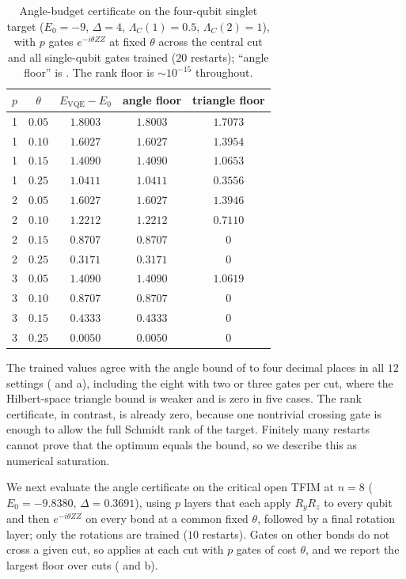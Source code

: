 \documentclass[reprint,aps,pra,floatfix,superscriptaddress,nofootinbib,longbibliography]{revtex4-2}
\theoremstyle{remark}
\theoremstyle{definition}
\begin{document}
\begin{table}[t]
\centering
\caption{Angle-budget certificate on the four-qubit singlet target ($E_0=-9$,
$\Delta=4$, $\Lambda_C(1)=0.5$, $\Lambda_C(2)=1$), with $p$ gates
$e^{-i\theta ZZ}$ at fixed $\theta$ across the central cut and all single-qubit
gates trained ($20$ restarts); ``angle floor'' is . The rank
floor is ${\sim}10^{-15}$ throughout.}
\label{tab:angle}
{\small\setlength{\tabcolsep}{5pt}
\begin{tabular}{ccccc}
\toprule
$p$ & $\theta$ & $E_{\mathrm{VQE}}-E_0$ & angle floor & triangle floor\\
\midrule
1 & $0.05$ & $1.8003$ & $1.8003$ & $1.7073$\\
1 & $0.10$ & $1.6027$ & $1.6027$ & $1.3954$\\
1 & $0.15$ & $1.4090$ & $1.4090$ & $1.0653$\\
1 & $0.25$ & $1.0411$ & $1.0411$ & $0.3556$\\
2 & $0.05$ & $1.6027$ & $1.6027$ & $1.3946$\\
2 & $0.10$ & $1.2212$ & $1.2212$ & $0.7110$\\
2 & $0.15$ & $0.8707$ & $0.8707$ & $0$\\
2 & $0.25$ & $0.3171$ & $0.3171$ & $0$\\
3 & $0.05$ & $1.4090$ & $1.4090$ & $1.0619$\\
3 & $0.10$ & $0.8707$ & $0.8707$ & $0$\\
3 & $0.15$ & $0.4333$ & $0.4333$ & $0$\\
3 & $0.25$ & $0.0050$ & $0.0050$ & $0$\\
\bottomrule
\end{tabular}}
\end{table}

The trained values agree with the angle bound of  to four
decimal places in all $12$ settings ( and a),
including the eight with two or three gates per cut, where the Hilbert-space
triangle bound is weaker and is zero in five cases. The rank certificate, in contrast, is
already zero, because one nontrivial crossing gate is enough to allow the full
Schmidt rank of the target. Finitely many restarts cannot prove that the optimum
equals the bound, so we describe this as numerical saturation.

We next evaluate the angle certificate on the critical open TFIM at $n=8$
($E_0=-9.8380$, $\Delta=0.3691$), using $p$ layers that each apply $R_yR_z$ to
every qubit and then $e^{-i\theta ZZ}$ on every bond at a common fixed $\theta$,
followed by a final rotation layer; only the rotations are trained ($10$
restarts). Gates on other bonds do not cross a given cut, so 
applies at each cut with $p$ gates of cost $\theta$, and we report the largest
floor over cuts ( and b).
\end{document}
